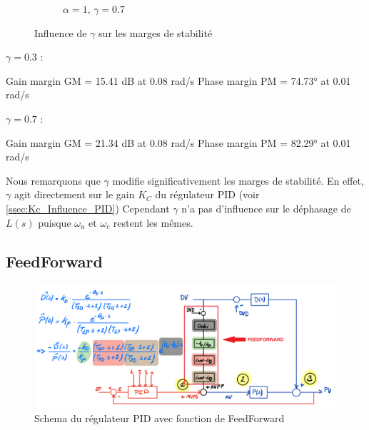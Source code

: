 \begin{enumerate}
\begin{figure}[H]
\begin{subfigure}[b]{0.48\textwidth}
            \caption{$\alpha = 1,\, \gamma = 0.7$}
        \end{subfigure}
        \caption{Influence de $\gamma$ sur les marges de stabilité}
        \label{fig:MarginsAlpha}
    \end{figure}
    $\gamma = 0.3$ :
    \begin{python*}
    Gain margin GM = 15.41 dB at 0.08 rad/s
    Phase margin PM = 74.73° at 0.01 rad/s   
    \end{python*}
    $\gamma = 0.7$ :
    \begin{python*}
    Gain margin GM = 21.34 dB at 0.08 rad/s
    Phase margin PM = 82.29° at 0.01 rad/s
    \end{python*}
    Nous remarquons que $\gamma$ modifie significativement les marges de stabilité. En effet, $\gamma$ agit directement sur le gain $K_C$ du régulateur PID (voir \ref{ssec:Kc_Influence_PID})
    Cependant $\gamma$ n'a pas d'influence sur le déphasage de $L(s)$ puisque $\omega_u$ et $\omega_c$ restent les mêmes.
\end{enumerate}


\subsection{FeedForward}

\begin{figure}[h]
    \centering
    \includegraphics[width=\textwidth]{figures/schemaFF.png}
    \caption{Schema du régulateur PID avec fonction de FeedForward}
	\label{fig:schemaFF}
\end{figure}

